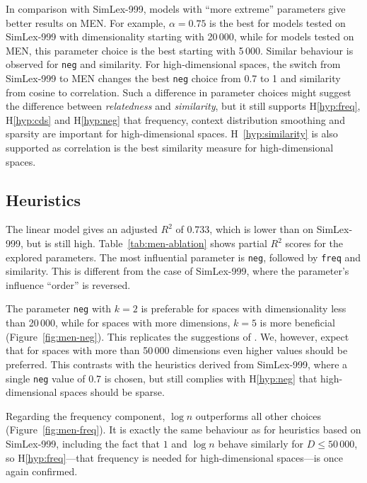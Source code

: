 In comparison with SimLex-999, models with ``more extreme'' parameters give better results on MEN. For example, $\alpha = 0.75$ is the best for models tested on SimLex-999 with dimensionality starting with 20\,000, while for models tested on MEN, this parameter choice is the best starting with 5\,000. Similar behaviour is observed for \texttt{neg} and similarity. For high-dimensional spaces, the switch from SimLex-999 to MEN changes the best \texttt{neg} choice from 0.7 to 1 and similarity from cosine to correlation. Such a difference in parameter choices might suggest the difference between \textit{relatedness} and \textit{similarity}, but it still supports H\ref{hyp:freq}, H\ref{hyp:cds} and H\ref{hyp:neg} that frequency, context distribution smoothing and sparsity are important for high-dimensional spaces. H~\ref{hyp:similarity} is also supported as correlation is the best similarity measure for high-dimensional spaces.

\subsection{Heuristics}
\label{sec:heuristics-men}




The linear model gives an adjusted $R^2$ of 0.733, which is lower than on SimLex-999, but is still high. Table~\ref{tab:men-ablation} shows partial $R^2$ scores for the explored parameters. The most influential parameter is \texttt{neg}, followed by \texttt{freq} and similarity. This is different from the case of SimLex-999, where the parameter's influence ``order'' is reversed.


The parameter \texttt{neg} with $k = 2$ is preferable for spaces with dimensionality less than 20\,000, while for spaces with more dimensions,
$k = 5$ is more beneficial (Figure~\ref{fig:men-neg}). This replicates the suggestions of . We, however, expect that for spaces with more than 50\,000 dimensions even higher values should be preferred. This contrasts with the heuristics derived from SimLex-999, where a single \texttt{neg} value of 0.7 is chosen, but still complies with H\ref{hyp:neg} that high-dimensional spaces should be sparse.

Regarding the frequency component, $\log n$ outperforms all other choices (Figure~\ref{fig:men-freq}). It is exactly the same behaviour as for heuristics based on SimLex-999, including the fact that $1$ and $\log n$ behave similarly for $D \leq 50\,000$, so H\ref{hyp:freq}---that frequency is needed for high-dimensional spaces---is once again confirmed.

